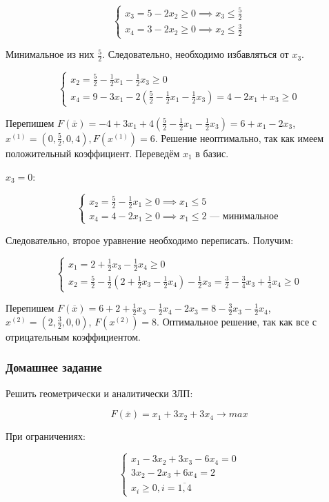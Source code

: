 \documentclass{article}
\begin{document}
$$
\begin{cases}
    x_3 = 5 - 2x_2 \ge 0 \implies x_3 \le \frac{5}{2} \\
    x_4 = 3 - 2x_2 \ge 0 \implies x_2 \le \frac{3}{2}
\end{cases}
$$

Минимальное из них $\frac{5}{2}$. Следовательно, необходимо избавляться от $x_3$.

$$
\begin{cases}
x_2 = \frac{5}{2} - \frac{1}{2} x_1 - \frac{1}{2} x_3 \ge 0 \\
x_4 = 9 - 3x_1 - 2 (\frac{5}{2} - \frac{1}{2} x_1 - \frac{1}{2} x_3) = 4 - 2x_1 + x_3 \ge 0
\end{cases}
$$

Перепишем $F(\overline{x}) = -4 + 3x_1 + 4 (\frac{5}{2} - \frac{1}{2} x_1 - \frac{1}{2} x_3) = 6 + x_1 - 2x_3$, $x^{(1)} = (0,\frac{5}{2},0,4), F(x^{(1)}) = 6$. Решение неоптимально, так как имеем положительный коэффициент. Переведём $x_1$ в базис.

$x_3 = 0$:

$$
\begin{cases}
  x_2 = \frac{5}{2} - \frac{1}{2} x_1 \ge 0 \implies x_1 \le 5 \\
  x_4 = 4 - 2x_1 \ge 0 \implies x_1 \le 2 \text{ — минимальное}  
\end{cases}
$$

Следовательно, второе уравнение необходимо переписать. Получим:

$$
\begin{cases}
  x_1 = 2 + \frac{1}{2} x_3 - \frac{1}{2} x_4 \ge 0 \\
  x_2 = \frac{5}{2} - \frac{1}{2} (2 + \frac{1}{2} x_3 - \frac{1}{2} x_4) - \frac{1}{2} x_3 = \frac{3}{2} - \frac{3}{4} x_3 + \frac{1}{4} x_4 \ge 0  
\end{cases}
$$

Перепишем $F(\overline{x}) = 6 + 2 + \frac{1}{2} x_3 - \frac{1}{2} x_4 - 2x_3 = 8 - \frac{3}{2} x_3 - \frac{1}{2} x_4$, $x^{(2)} = (2, \frac{3}{2}, 0, 0)$, $F(x^{(2)}) = 8$. Оптимальное решение, так как все с отрицательным коэффициентом.

\subsubsection{Домашнее задание}

Решить геометрически и аналитически ЗЛП:

$$
F(\overline{x}) = x_1 + 3x_2 + 3x_4 \to max
$$

При ограничениях:

$$
\begin{cases}
    x_1 - 3x_2 + 3x_3 - 6x_4 = 0 \\
    3x_2 - 2x_3 + 6x_4 = 2 \\
    x_{i} \ge 0, i = \overline{1, 4}
\end{cases}
$$
\end{document}
